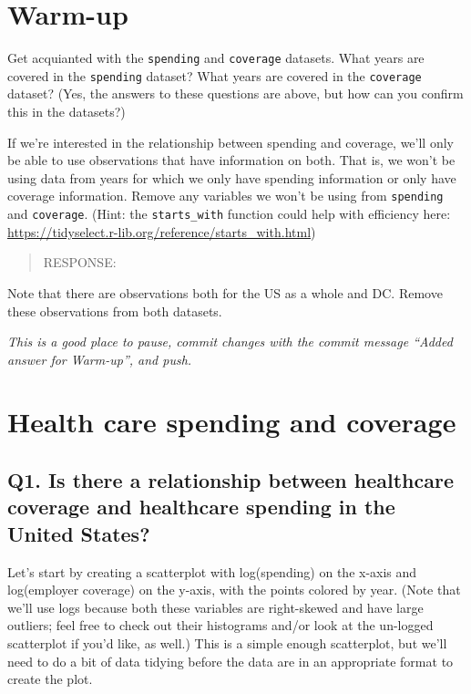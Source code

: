 \documentclass[
]{article}
\begin{document}
\hypertarget{warm-up}{%
\section{Warm-up}\label{warm-up}}

Get acquianted with the \texttt{spending} and \texttt{coverage}
datasets. What years are covered in the \texttt{spending} dataset? What
years are covered in the \texttt{coverage} dataset? (Yes, the answers to
these questions are above, but how can you confirm this in the
datasets?)

If we're interested in the relationship between spending and coverage,
we'll only be able to use observations that have information on both.
That is, we won't be using data from years for which we only have
spending information or only have coverage information. Remove any
variables we won't be using from \texttt{spending} and
\texttt{coverage}. (Hint: the \texttt{starts\_with} function could help
with efficiency here:
\url{https://tidyselect.r-lib.org/reference/starts_with.html})

\begin{quote}
RESPONSE:
\end{quote}

Note that there are observations both for the US as a whole and DC.
Remove these observations from both datasets.

\emph{This is a good place to pause, commit changes with the commit
message ``Added answer for Warm-up'', and push.}

\hypertarget{health-care-spending-and-coverage}{%
\section{Health care spending and
coverage}\label{health-care-spending-and-coverage}}

\hypertarget{q1.-is-there-a-relationship-between-healthcare-coverage-and-healthcare-spending-in-the-united-states}{%
\subsection{Q1. Is there a relationship between healthcare coverage and
healthcare spending in the United
States?}\label{q1.-is-there-a-relationship-between-healthcare-coverage-and-healthcare-spending-in-the-united-states}}

Let's start by creating a scatterplot with log(spending) on the x-axis
and log(employer coverage) on the y-axis, with the points colored by
year. (Note that we'll use logs because both these variables are
right-skewed and have large outliers; feel free to check out their
histograms and/or look at the un-logged scatterplot if you'd like, as
well.) This is a simple enough scatterplot, but we'll need to do a bit
of data tidying before the data are in an appropriate format to create
the plot.
\end{document}
